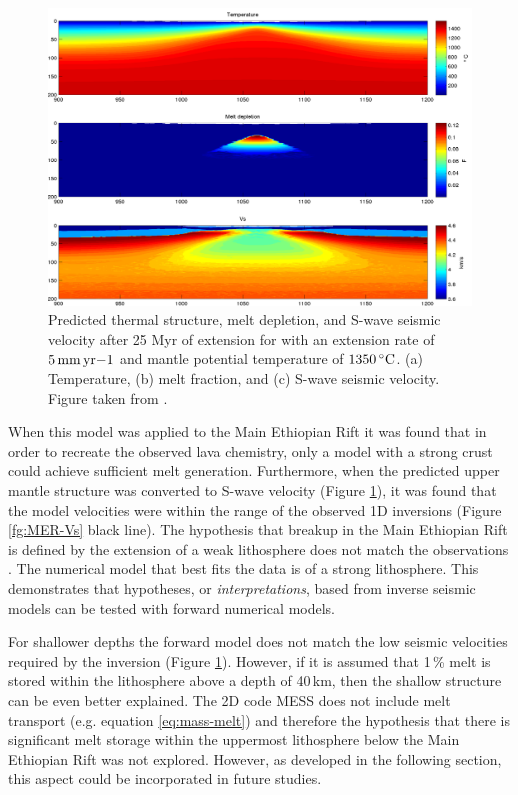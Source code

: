 \begin{figure}
\centering
\includegraphics[width=\textwidth]{./figures/ch2-mantleVs.pdf}
\caption{Predicted thermal structure, melt depletion, and S-wave seismic velocity after 25 Myr of extension for with an extension rate of $5\rm\,mm\,yr{-1}$ and mantle potential temperature of $1350\rm\,^{\circ}C$. (a) Temperature, (b) melt fraction, and (c) S-wave seismic velocity. Figure taken from \cite{armitage-etal-g3-2018}.}
\label{fg:mantleVs}
\end{figure} 

When this model was applied to the Main Ethiopian Rift it was found that in order to recreate the observed lava chemistry, only a model with a strong crust could achieve sufficient melt generation. Furthermore, when the predicted upper mantle structure was converted to S-wave velocity (Figure \ref{fg:mantleVs}), it was found that the model velocities were within the range of the observed 1D inversions (Figure \ref{fg:MER-Vs} black line). The hypothesis that breakup in the Main Ethiopian Rift is defined by the extension of a weak lithosphere does not match the observations \citep[c.f.][]{keranen-etal-2009}. The numerical model that best fits the data is of a strong lithosphere. This demonstrates that hypotheses, or \emph{interpretations}, based from inverse seismic models can be tested with forward numerical models.

For shallower depths the forward model does not match the low seismic velocities required by the inversion (Figure \ref{fg:mantleVs}). However, if it is assumed that 1\,\% melt is stored within the lithosphere above a depth of 40\,km, then the shallow structure can be even better explained. The 2D code MESS does not include melt transport (e.g. equation \ref{eq:mass-melt}) and therefore the hypothesis that there is significant melt storage within the uppermost lithosphere below the Main Ethiopian Rift was not explored. However, as developed in the following section, this aspect could be incorporated in future studies.

